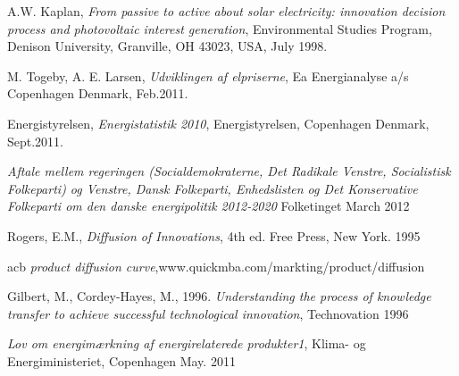 \documentclass[journal]{IEEEtran}
\begin{document}
\begin{thebibliography}{1}

A.W. Kaplan, \emph{From passive to active about solar electricity: innovation decision
process and photovoltaic interest generation}, \relax Environmental Studies Program, Denison University, Granville, OH 43023, USA, July 1998.

M. Togeby, A. E. Larsen, \emph{Udviklingen af elpriserne}, \relax Ea Energianalyse a/s Copenhagen Denmark, Feb.2011.

Energistyrelsen, \emph{Energistatistik 2010}, \relax Energistyrelsen, Copenhagen Denmark, Sept.2011.

\emph{Aftale mellem regeringen (Socialdemokraterne, Det Radikale Venstre, Socialistisk Folkeparti) og Venstre, Dansk Folkeparti, Enhedslisten og Det Konservative Folkeparti
om den danske energipolitik 2012-2020} \relax Folketinget March 2012

Rogers, E.M., \emph{Diffusion of Innovations}, \relax 4th ed. Free Press, New York. 1995

acb \emph{product diffusion curve},\relax www.quickmba.com/markting/product/diffusion

Gilbert, M., Cordey-Hayes, M., 1996. \emph{Understanding the process of
knowledge transfer to achieve successful technological innovation}, \relax Technovation 1996

\emph{Lov om energimærkning af energirelaterede produkter1}, \relax Klima- og Energiministeriet, Copenhagen May. 2011 

\end{thebibliography}




\end{document}
